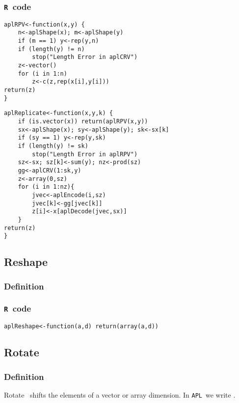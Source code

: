 \documentclass[11pt]{amsart}
\theoremstyle{plain}
\theoremstyle{definition}
\theoremstyle{remark}
\newcommand{\tR}{\texttt{R}}
\newcommand{\tA}{\texttt{APL}}
\newcommand{\tAc}[1]{{\apl{#1}}}
\begin{document}
\subsubsection{\tR\ code}\quad
\begin{lstlisting}
aplRPV<-function(x,y) {
    n<-aplShape(x); m<-aplShape(y)
    if (m == 1) y<-rep(y,n)
    if (length(y) != n)
        stop("Length Error in aplCRV")
    z<-vector()
    for (i in 1:n)
        z<-c(z,rep(x[i],y[i]))
return(z)
}
\end{lstlisting}
\begin{lstlisting}
aplReplicate<-function(x,y,k) {
    if (is.vector(x)) return(aplRPV(x,y))
    sx<-aplShape(x); sy<-aplShape(y); sk<-sx[k]
    if (sy == 1) y<-rep(y,sk)
    if (length(y) != sk)
        stop("Length Error in aplRPV")
    sz<-sx; sz[k]<-sum(y); nz<-prod(sz)
    gg<-aplCRV(1:sk,y)
    z<-array(0,sz)
    for (i in 1:nz){
        jvec<-aplEncode(i,sz)
        jvec[k]<-gg[jvec[k]]
        z[i]<-x[aplDecode(jvec,sx)]
    }
return(z)
}
\end{lstlisting}


\subsection{Reshape}\quad
\subsubsection{Definition}
\subsubsection{\tR\ code}\quad
\begin{lstlisting}
aplReshape<-function(a,d) return(array(a,d))
\end{lstlisting}

\subsection{Rotate}
\subsubsection{Definition}
Rotate~\citep[p. 191--193]{helzer_89} shifts the elements of a vector or array dimension. In \tA\ we write
\tAc{A\qrotate B}.
\end{document}
